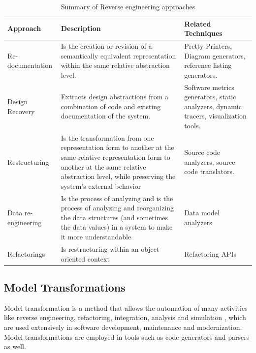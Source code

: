 \begin{table}[h]
\caption{Summary of Reverse engineering approaches}
\label{table:approachesRE}
\begin{tabularx}{\textwidth}{X|X|X}
\toprule
\rowcolor[HTML]{BBDAFF}
\textbf{Approach} & \textbf{Description}  & \textbf{Related Techniques}  \\ \hline
Re-documentation & Is the creation or revision of a semantically equivalent representation within the same relative abstraction level. & Pretty Printers, Diagram generators, reference listing generators. \\ \hline

Design Recovery & Extracts design abstractions from a combination of code and existing documentation of the system. & Software metrics generators, static analyzers, dynamic tracers, visualization tools. \\ \hline

Restructuring & Is the transformation from one representation form to another at the same relative representation form to another at the same relative abstraction level, while preserving the system's external behavior & Source code analyzers, source code translators.   \\ \hline

Data re-engineering & Is the process of analyzing and is the process of analyzing and
reorganizing the data structures (and sometimes the data values) in a system to make it more understandable & Data model analyzers  \\ \hline

Refactorings & Is restructuring within an object-oriented context & Refactoring APIs \\ \hline  
 
\end{tabularx}
\end{table}

\subsection{Model Transformations}

Model transformation is a method that allows the automation of many activities like reverse engineering, refactoring, integration, analysis and simulation \cite{biehl2010literature}, which are used extensively in software development, maintenance and modernization. Model transformations are employed in tools such as code generators and parsers as well.

